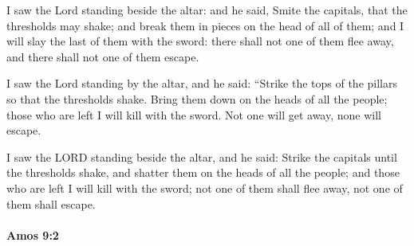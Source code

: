 			\begin{versebox}
					\item[BHS] 
					\item[LXX] 
					\item[ASV] I saw the Lord standing beside the altar: and he said, Smite the capitals, that the thresholds may shake; and break them in pieces on the head of all of them; and I will slay the last of them with the sword: there shall not one of them flee away, and there shall not one of them escape.
					\item[NIV] I saw the Lord standing by the altar, and he said: “Strike the tops of the pillars so that the thresholds shake. Bring them down on the heads of all the people; those who are left I will kill with the sword. Not one will get away, none will escape.
					\item[NRSV] I saw the LORD standing beside the altar, and he said: Strike the capitals until the thresholds shake, and shatter them on the heads of all the people; and those who are left I will kill with the sword; not one of them shall flee away, not one of them shall escape.
			\end{versebox}

		\paragraph{Amos 9:2} %
			\label{AMOS-9-2}

